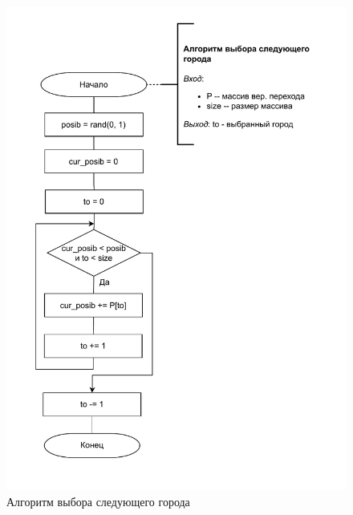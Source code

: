 \begin{figure}[H]
	\begin{center}
		\includegraphics[scale=0.7]{img/cnl.pdf}
	\end{center}
	\captionsetup{justification=centering}
	\caption{Алгоритм выбора следующего города}
	\label{img:choose}
\end{figure}

